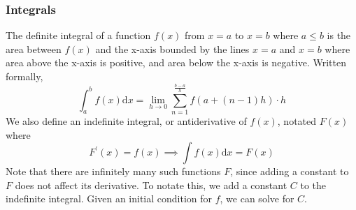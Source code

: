 \subsubsection{Integrals}
The definite integral of a function $f(x)$ from $x=a$ to $x=b$ where $a \leq b$ is the area between $f(x)$ and the x-axis bounded by the lines $x=a$ and $x=b$ where area above the x-axis is positive, and area below the x-axis is negative. Written formally,
\begin{equation*}
\int_{a}^{b}{f(x) \mathrm{d}x} = \lim\limits_{h \to 0}{\sum_{n=1}^{\frac{b-a}{h}}}{f(a + (n-1)h) \cdot h}
\end{equation*}
We also define an indefinite integral, or antiderivative of $f(x)$, notated $F(x)$ where
\begin{equation*}
F^\prime(x) = f(x) \implies \int{f(x)\mathrm{d}x} = F(x)
\end{equation*}
Note that there are infinitely many such functions $F$, since adding a constant to $F$ does not affect its derivative. To notate this, we add a constant $C$ to the indefinite integral. Given an initial condition for $f$, we can solve for $C$.\\


